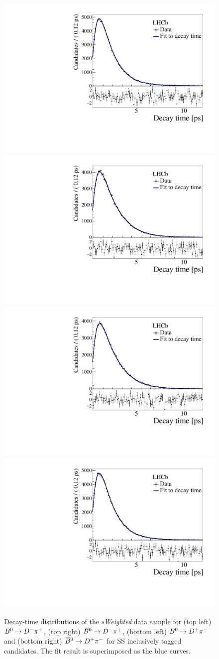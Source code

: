 \begin{figure}[t]
        \begin{center}
                \includegraphics[width=0.4\linewidth]{05DecaytimeFit/figs/datafit/sFit_B2DmPipSSincl_Bd2DPi.pdf}
                \includegraphics[width=0.4\linewidth]{05DecaytimeFit/figs/datafit/sFit_Bbar2DmPipSSincl_Bd2DPi.pdf}\\
                \includegraphics[width=0.4\linewidth]{05DecaytimeFit/figs/datafit/sFit_B2DpPimSSincl_Bd2DPi.pdf}
                \includegraphics[width=0.4\linewidth]{05DecaytimeFit/figs/datafit/sFit_Bbar2DpPimSSincl_Bd2DPi.pdf}
        \end{center}
        \vspace{-2mm}
        \caption{Decay-time distributions of the \emph{sWeighted} data
  sample for (top left) $B^0 \rightarrow D^-\pi^+$,  (top right) $\kern 0.18em\overline{\kern -0.18em B}{}^0 \rightarrow D^-\pi^+$,  (bottom left) $B^0 \rightarrow D^+\pi^-$
  and  (bottom right) $\kern 0.18em\overline{\kern -0.18em B}{}^0 \rightarrow D^+\pi^-$ for SS inclusively tagged candidates. The fit result is superimposed as the blue curves.}
        \label{fig:timefitplot-4ratesSS}
\end{figure}

